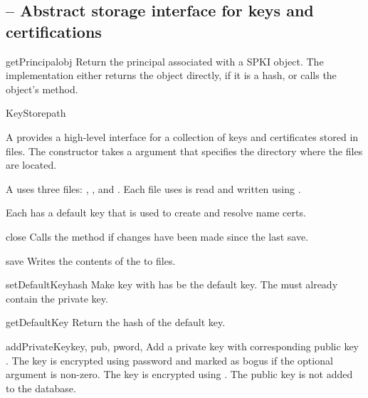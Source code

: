 \documentclass{howto}
\begin{document}
\subsection{
	-- Abstract storage interface for keys and certifications}

\begin{funcdesc}{getPrincipal}{obj}
Return the principal associated with a SPKI object.  The
implementation either returns the object directly, if it is a hash, or
calls the object's  method.
\end{funcdesc}

\begin{classdesc}{KeyStore}{path}

A  provides a high-level interface for a collection of
keys and certificates stored in files.  The constructor takes a
 argument that specifies the directory where the files are
located.  

A  uses three files: , , and
.  Each file uses is read and written using
.

Each  has a default key that is used to create and
resolve name certs.

\begin{methoddesc}{close}{}
Calls the  method if changes have been made since the
last save. 
\end{methoddesc}

\begin{methoddesc}{save}{}
Writes the contents of the  to files.
\end{methoddesc}

\begin{methoddesc}{setDefaultKey}{hash}
Make key with has  be the default key.  The 
must already contain the private key.
\end{methoddesc}

\begin{methoddesc}{getDefaultKey}{}
Return the hash of the default key.
\end{methoddesc}

\begin{methoddesc}{addPrivateKey}{key, pub, pword, }
Add a private key  with corresponding public key .
The key is encrypted using password  and marked as bogus if
the optional  argument is non-zero.  The key is encrypted
using .  The public
key is not added to the database.
\end{methoddesc}


\end{classdesc}
\end{document}
